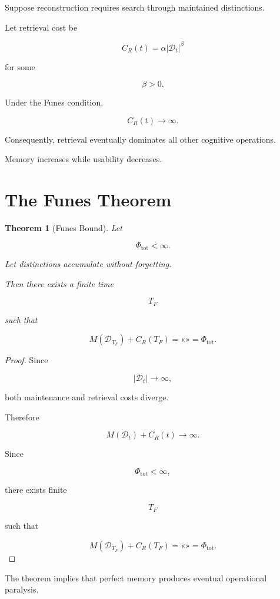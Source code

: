 \documentclass[12pt,oneside]{book}
\theoremstyle{plain} \newtheorem{theorem}{Theorem}[chapter] \newtheorem{lemma}[theorem]{Lemma} \newtheorem{proposition}[theorem]{Proposition} \newtheorem{corollary}[theorem]{Corollary}
\theoremstyle{definition} \newtheorem{definition}[theorem]{Definition} \newtheorem{axiom}[theorem]{Axiom} \newtheorem{construction}[theorem]{Construction}
\theoremstyle{remark} \newtheorem{remark}[theorem]{Remark} \newtheorem{example}[theorem]{Example}
\newcommand{\D}{\mathcal{D}} \newcommand{\R}{\mathcal{R}} \newcommand{\F}{\mathcal{F}} \newcommand{\U}{\mathcal{U}} \newcommand{\M}{\mathcal{M}} \newcommand{\G}{\Gamma}
\begin{document}
Suppose reconstruction requires search through maintained distinctions.

Let retrieval cost be

\[
C_R(t)
=
\alpha |\D_t|^\beta
\]

for some

\[
\beta>0.
\]

Under the Funes condition,

\[
C_R(t)
\rightarrow
\infty.
\]

Consequently, retrieval eventually dominates all other cognitive operations.

Memory increases while usability decreases.

\section{The Funes Theorem}

\begin{theorem}[Funes Bound]

Let

\[
\Phi_{\mathrm{tot}}
<
\infty.
\]

Let distinctions accumulate without forgetting.

Then there exists a finite time

\[
T_F
\]

such that

\[
M(\D_{T_F})
+
C_R(T_F)
=
«»
=
\Phi_{\mathrm{tot}}.
\]

\end{theorem}

\begin{proof}

Since

\[
|\D_t|
\rightarrow
\infty,
\]

both maintenance and retrieval costs diverge.

Therefore

\[
M(\D_t)+C_R(t)
\rightarrow
\infty.
\]

Since

\[
\Phi_{\mathrm{tot}}
<
\infty,
\]

there exists finite

\[
T_F
\]

such that

\[
M(\D_{T_F})
+
C_R(T_F)
=
«»
=
\Phi_{\mathrm{tot}}.
\]

\end{proof}

The theorem implies that perfect memory produces eventual operational paralysis.
\end{document}

